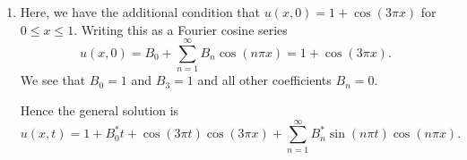 \begin{derivation}
\begin{enumerate}[label=\alph*)]
      We therefore have the two interesting cases $F_0(x) = 1$ and $F_n = \cos (n \pi x)$.

      For the temporal equation we start assuming $k = 0$ as an interesting case was found here.
      We get
      \begin{align*}
        G''(t) &= 0 \\
        G'(t) &= B_0^{*} \\
        G_0(t) &= B_0 + B_{0}^{*}t
      .\end{align*}

      For $k < 0$, where the other interesting case was found we get
      \begin{align*}
        G''(t) - k G(t) &= 0 \\
        G''(t) - \left( -p_n^2 \right) G(t) &= 0 \\
        G_n(t) &= B_n \cos (n \pi t)+ B_n^{*} \sin (n \pi t)
      .\end{align*}

      We therefore have the two fundamental solutions
      \begin{align*}
        u_0(x,t) &= G_0(t) F_0(x) = B_0 + B_0^{*}t \\
        u_n(x,t) &= G_n(t) F_n(x) = \left( B_n \cos (n\pi t) + B_n^{*}\sin (n \pi t) \right) \cos ( n \pi x) \\
      .\end{align*}
      Which gives the general solution
      \begin{equation*}
        u(x,t) = u_0(x,t) + \sum_{n = 1}^{\infty} u_n(x,t) = B_0 + B_0^{*}t + \sum_{n = 1}^{\infty} \left( B_n \cos \left( n \pi t \right) + B_n^{*} \sin \left( n \pi t \right) \right) \cos \left( n \pi x \right)
      .\end{equation*}
      
    \item Here, we have the additional condition that $u(x,0) = 1 + \cos (3 \pi x)$ for $0 \leq x \leq 1$.
      Writing this as a Fourier cosine series
      \begin{equation*}
        u(x,0) = B_0 + \sum_{n = 1}^{\infty} B_n \cos \left( n \pi x \right) = 1 + \cos (3\pi x)
      .\end{equation*}
      We see that $B_0 = 1$ and $B_3 = 1$ and all other coefficients $B_n = 0$.

      Hence the general solution is
      \begin{equation*}
        u(x,t) = 1 + B_0^{*}t + \cos(3 \pi t) \cos (3\pi x) + \sum_{n = 1}^{\infty} B_n^{*} \sin \left(  n \pi t \right) \cos ( n \pi x)
      .\end{equation*}
  \end{enumerate}
\end{derivation}

